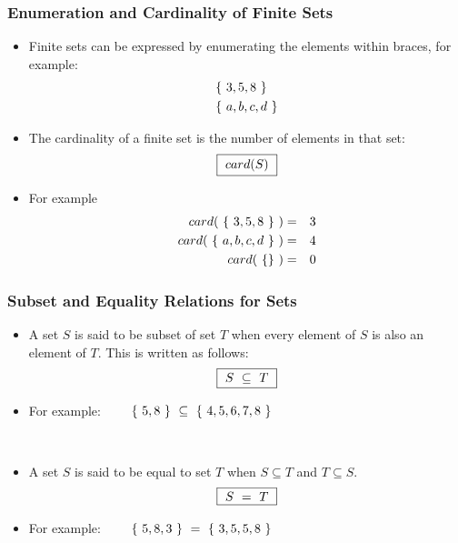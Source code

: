 \documentclass{beamer}
\begin{document}
\begin{frame}
\frametitle{ Enumeration and Cardinality of Finite Sets}

\begin{itemize}
\item Finite sets can be expressed by \alert{enumerating} the elements within braces, for example:
\begin{eqnarray*}
&\{~3,5,8~\} \\
&\{~ a,b,c,d ~\}
\end{eqnarray*}
\end{itemize}

\begin{itemize}
\item The \alert{cardinality} of a finite set is the number of elements in that set:
\begin{eqnarray*}
\fbox{~$
    card(S)
~$}
\end{eqnarray*}
\item For example
\begin{eqnarray*}
card(~\{~3,5,8~\}~) &=& 3 \\
card(~\{~ a,b,c,d ~\}~) &=& 4\\
card(~\{\}~) &=& 0
\end{eqnarray*}
\end{itemize}

\end{frame}





\begin{frame}


\frametitle{Subset and Equality Relations for Sets}

\begin{itemize}
\item A set $S$ is said to be \alert{subset} of set $T$ when every element of $S$ is also an element of $T$.  This is written as follows:
\begin{eqnarray*}
\fbox{~$
    S  ~\subseteq~ T
~$}
\end{eqnarray*}
\item For example:~~~~
$
\{~5,8~\} ~\subseteq~ \{~4,5,6,7,8~\}
$
\end{itemize}

~

\begin{itemize}
\item A set $S$ is said to be equal to set $T$ when $S\subseteq T$ and $T\subseteq S$.
\begin{eqnarray*}
\fbox{~$
    S  ~=~ T
~$}
\end{eqnarray*}
\item For example:~~~~
$
\{~5,8,3~\} ~=~ \{~3,5,5,8~\}
$
\end{itemize}

\end{frame}
\end{document}

